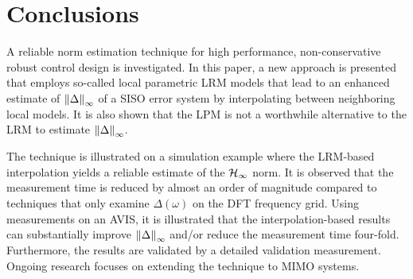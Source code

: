 \section{Conclusions}
\label{sec:lrmhinf:conclusion}
A reliable \Hinf{} norm estimation technique for high performance, non-conservative robust control design is investigated.
In this paper, a new approach is presented that employs so-called local parametric \gls{LRM} models that lead to an enhanced estimate of $\left\| \Delta \right\|_{\infty}$ of a \gls{SISO} error system by interpolating between neighboring local models.
It is also shown that the \gls{LPM} is not a worthwhile alternative to the \gls{LRM} to estimate $\left\| \Delta \right\|_{\infty}$.

The technique is illustrated on a simulation example where the \gls{LRM}-based interpolation yields a reliable estimate of the $\mathcal{H}_{\infty}{}$ norm.
It is observed that the measurement time is reduced by almost an order of magnitude compared to techniques that only examine $\Delta(\omega)$ on the \gls{DFT} frequency grid.
Using measurements on an \gls{AVIS}, it is illustrated that the interpolation-based results can substantially improve $\left\| \Delta \right\|_{\infty}$ and/or reduce the measurement time four-fold.
Furthermore, the results are validated by a detailed validation measurement.
Ongoing research focuses on extending the technique to \gls{MIMO} systems.
